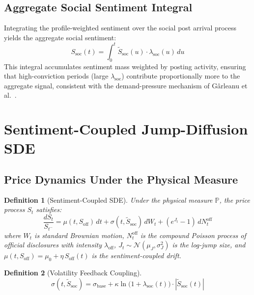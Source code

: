 \documentclass[10pt,twocolumn]{article}
\newtheorem{definition}{Definition}[section]
\newcommand{\Prob}{\mathbb{P}}
\newcommand{\Stilde}{\tilde{S}}
\newcommand{\lamsoc}{\lambda_{\mathrm{soc}}}
\newcommand{\Soff}{S_{\mathrm{off}}}
\newcommand{\Ssoc}{S_{\mathrm{soc}}}
\begin{document}
\subsection{Aggregate Social Sentiment Integral}

Integrating the profile-weighted sentiment over the social post arrival process
yields the aggregate social sentiment:
\begin{equation}
\label{eq:ssoc}
\Ssoc(t)=\int_0^t\Stilde_{\mathrm{soc}}(u)\cdot\lamsoc(u)\,du
\end{equation}
This integral accumulates sentiment mass weighted by posting activity, ensuring
that high-conviction periods (large $\lamsoc$) contribute proportionally more
to the aggregate signal, consistent with the demand-pressure mechanism of
G\^{a}rleanu et al.~\cite{garleanu2009}.

\section{Sentiment-Coupled Jump-Diffusion SDE}
\label{sec:sde}

\subsection{Price Dynamics Under the Physical Measure}

\begin{definition}[Sentiment-Coupled SDE]
\label{def:sde}
Under the physical measure $\Prob$, the price process $S_t$ satisfies:
\begin{equation}
\label{eq:sde}
\frac{dS_t}{S_{t^-}}=\mu(t,\Soff)\,dt
  +\sigma(t,\Stilde_{\mathrm{soc}})\,dW_t
  +(e^{J_t}-1)\,dN_t^{\mathrm{off}}
\end{equation}
where $W_t$ is standard Brownian motion, $N_t^{\mathrm{off}}$ is the
compound Poisson process of official disclosures with intensity
$\lambda_{\mathrm{off}}$, $J_t\sim\mathcal{N}(\mu_J,\sigma_J^2)$ is the
log-jump size, and $\mu(t,\Soff)=\mu_0+\eta\,\Soff(t)$ is the
sentiment-coupled drift.
\end{definition}

\begin{definition}[Volatility Feedback Coupling]
\label{def:vol}
\begin{equation}
\label{eq:vol}
\sigma(t,\Stilde_{\mathrm{soc}})=\sigma_{\mathrm{base}}
  +\kappa\ln\!\bigl(1+\lamsoc(t)\bigr)\cdot|\Stilde_{\mathrm{soc}}(t)|
\end{equation}
\end{definition}
\end{document}
